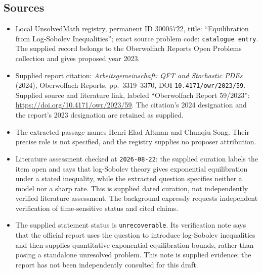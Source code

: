 \documentclass[11pt]{article}
\begin{document}
\subsection{Sources}
\begin{itemize}
\item Local UnsolvedMath registry, permanent ID \(30005722\), title: ``Equilibration from Log-Sobolev Inequalities''; exact source problem code: \texttt{catalogue entry}. The supplied record belongs to the Oberwolfach Reports Open Problems collection and gives proposed year 2023.
\item Supplied report citation: \emph{Arbeitsgemeinschaft: QFT and Stochastic PDEs} (2024), Oberwolfach Reports, pp.\ 3319--3370, DOI \texttt{10.4171/owr/2023/59}. Supplied source and literature link, labeled ``Oberwolfach Report 59/2023'': \url{https://doi.org/10.4171/owr/2023/59}. The citation's 2024 designation and the report's 2023 designation are retained as supplied.
\item The extracted passage names Henri Elad Altman and Chunqiu Song. Their precise role is not specified, and the registry supplies no proposer attribution.
\item Literature assessment checked at \texttt{2026-08-22}: the supplied curation labels the item open and says that log-Sobolev theory gives exponential equilibration under a stated inequality, while the extracted question specifies neither a model nor a sharp rate. This is supplied dated curation, not independently verified literature assessment. The background expressly requests independent verification of time-sensitive status and cited claims.
\item The supplied statement status is \texttt{unrecoverable}. Its verification note says that the official report uses the question to introduce log-Sobolev inequalities and then supplies quantitative exponential equilibration bounds, rather than posing a standalone unresolved problem. This note is supplied evidence; the report has not been independently consulted for this draft.
\end{itemize}
\end{document}
